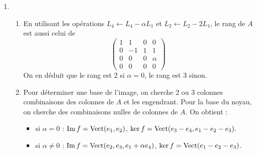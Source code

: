 \begin{enumerate}
\item \begin{enumerate}
\item  En utilisant les op\'{e}rations $L_{4}\leftarrow L_{4}-\alpha L_{1}$ et $L_{2}\leftarrow L_{2}-2L_{1}$, le rang de $A$ est aussi celui de 
\begin{displaymath}
\begin{pmatrix}
1 & 1 & 0 & 0 \\
0 & -1 & 1 & 1 \\ 
0 & 0 & 0 & \alpha  \\ 
0 & 0 & 0 & 0
\end{pmatrix}
 \end{displaymath}
On en d\'{e}duit que le rang est 2 si $\alpha =0$, le rang est 3 sinon.
\item  Pour d\'{e}terminer une base de l'image, on cherche 2 ou 3 colonnes combinaisons des colonnes de $A$ et les engendrant.
Pour la base du noyau, on cherche des combinaisons nulles de colonnes de $A$. On obtient :

\begin{itemize}
\item  si $\alpha =0$ : $\operatorname{Im} f=\operatorname{Vect}(e_{1},e_{2})$, $\ker f=\operatorname{Vect}(e_{3}-e_{4},e_{1}-e_{2}-e_{3}).$

\item  si $\alpha \neq 0$ : $\operatorname{Im} f=\operatorname{Vect}(e_{2},e_{3},e_{1}+\alpha e_{4})$, $\ker f=\operatorname{Vect}(e_{1}-e_{2}-e_{3})$.
\end{itemize}


\end{enumerate}
\end{enumerate}
